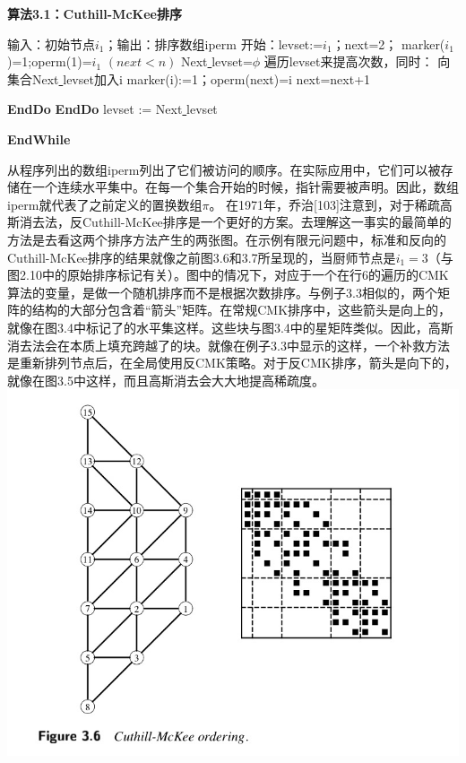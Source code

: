 \documentclass{article}
\begin{document}
\textbf{算法3.1：Cuthill-McKee排序}
\begin{codebox}

\li 输入：初始节点$i_1$；输出：排序数组iperm
\li     开始：levset:={$i_1$}；next=2；
\li       marker($i_1$)=1;operm(1)=$i_1$
\li         \While $(next<n)$ 
\li            \Do	Next\underline{ }levset=$\phi$
\li               遍历levset来提高次数，同时：
\li		{}
\li			\Do
\li					\Do
						向集合Next\underline{ }levset加入i
\li						marker(i):=1；operm(next)=i
\li						next=next+1

					\End		
					\li		\textbf{EndDo}
				\End
				\li		\textbf{EndDo}
				\li		levset := Next\underline{ }levset
			\End
			
		\End

                \End
\li		\textbf{EndWhile}
        \End
\end{codebox}
从程序列出的数组iperm列出了它们被访问的顺序。在实际应用中，它们可以被存储在一个连续水平集中。在每一个集合开始的时候，指针需要被声明。因此，数组iperm就代表了之前定义的置换数组$\pi$。
\newline
在1971年，乔治[103]注意到，对于稀疏高斯消去法，反Cuthill-McKee排序是一个更好的方案。去理解这一事实的最简单的方法是去看这两个排序方法产生的两张图。在示例有限元问题中，标准和反向的Cuthill-McKee排序的结果就像之前图3.6和3.7所呈现的，当厨师节点是$i_1=3$（与图2.10中的原始排序标记有关）。图中的情况下，对应于一个在行6的遍历的CMK算法的变量，是做一个随机排序而不是根据次数排序。与例子3.3相似的，两个矩阵的结构的大部分包含着“箭头”矩阵。在常规CMK排序中，这些箭头是向上的，就像在图3.4中标记了的水平集这样。这些块与图3.4中的星矩阵类似。因此，高斯消去法会在本质上填充跨越了的块。就像在例子3.3中显示的这样，一个补救方法是重新排列节点后，在全局使用反CMK策略。对于反CMK排序，箭头是向下的，就像在图3.5中这样，而且高斯消去会大大地提高稀疏度。
\newline\newline\newline\newline\newline\newline\newline\newline
\includegraphics[scale=0.25]{3_6.png}
\end{document}
